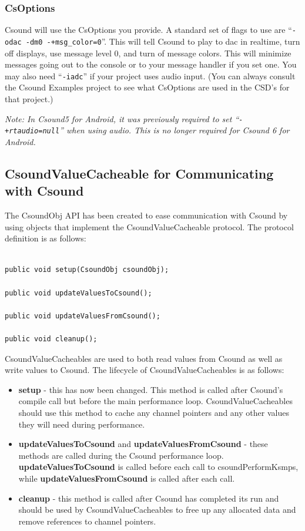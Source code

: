 \documentclass[11pt]{article}
\begin{document}
\subsubsection{CsOptions}

Csound will use the CsOptions you provide.  A standard set of flags to use are ``{\tt -odac -dm0 -+msg\_color=0}''. This will tell Csound to play to dac in realtime, turn off displays, use message level 0, and turn of message colors.  This will minimize messages going out to the console or to your message handler if you set one.  You may also need ``{\tt -iadc}'' if your project uses audio input. (You can always consult the Csound Examples project to see what CsOptions are used in the CSD's for that project.) 

\emph{Note: In Csound5 for Android, it was previously required to set \linebreak ``{\tt -+rtaudio=null}'' when using audio. This is no longer required for Csound 6 for Android.}
 

\subsection{CsoundValueCacheable for Communicating with Csound}

The CsoundObj API has been created to ease communication with Csound by using objects that implement the CsoundValueCacheable protocol.  The protocol definition is as follows:

\begin{lstlisting}[caption=CsoundValueCacheable Protocol Definition]

public void setup(CsoundObj csoundObj);
	
public void updateValuesToCsound();
	
public void updateValuesFromCsound();
	
public void cleanup();

\end{lstlisting}

CsoundValueCacheables are used to both read values from Csound as well as write values to Csound.  The lifecycle of CsoundValueCacheables is as follows:

\begin{itemize}
\item \textbf{setup} - this has now been changed. This method is called after Csound's compile call but before the main performance loop. CsoundValueCacheables should use this method to cache any channel pointers and any other values they will need during performance.
\item \textbf{updateValuesToCsound} and \textbf{updateValuesFromCsound} - these methods are called during the Csound performance loop. \textbf{updateValuesToCsound} is called before each call to csoundPerformKsmps, while \textbf{updateValuesFromCsound} is called after each call. 
\item \textbf{cleanup} - this method is called after Csound has completed its run and should be used by CsoundValueCacheables to free up any allocated data and remove references to channel pointers.
\end{itemize}
\end{document}
